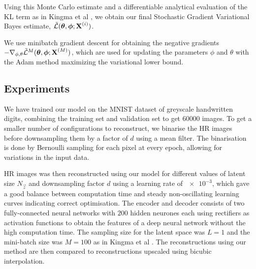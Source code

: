 Using this Monte Carlo estimate and a differentiable analytical evaluation of the KL term as in Kingma et al \cite{Kingma2013}, we obtain our final Stochastic Gradient Variational Bayes estimate, $\tilde{\mathcal{L}}(\bm{\mathrm{\theta}},\bm{\mathrm{\phi}};\bm{\mathrm{X}}^{(i)})$.

We use minibatch gradient descent for obtaining the negative gradients $-\nabla_{\phi,\theta} \tilde{\mathcal{L}}^M(\bm{\mathrm{\theta}},\bm{\mathrm{\phi}};\bm{\mathrm{X}}^{(M)})$, which are used for updating the parameters $\phi$ and $\theta$ with the Adam method \cite{Kingma2014b} maximizing the variational lower bound. 



\subsection{Experiments}
\label{sub:experiments}

We have trained our model on the MNIST dataset \cite{MNIST} of greyscale handwritten digits, combining the training set and validation set to get $60000$ images.  
To get a smaller number of configurations to reconstruct, we binarise the HR images before downsampling them by a factor of $d$ using a mean filter.
The binarisation is done by Bernoulli sampling for each pixel at every epoch, allowing for variations in the input data.

HR images was then reconstructed using our model for different values of latent size $N_{\vec{z}}$ and downsampling factor $d$ using a learning rate of $\num{e-3}$, which gave a good balance between computation time and steady non-oscillating learning curves indicating correct optimisation.
The encoder and decoder consists of two fully-connected neural networks with $200$ hidden neurones each using rectifiers as activation functions to obtain the features of a deep neural network without the high computation time.
The sampling size for the latent space was $L = 1$ and the mini-batch size was $M = 100$ as in Kingma et al \cite{Kingma2013}.
The reconstructions using our method are then compared to reconstructions upscaled using bicubic interpolation.
